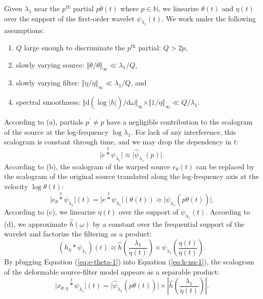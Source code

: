 \documentclass[twoside,a4paper]{article}
\begin{document}
Given $\lambda_1$ near the $p^{\textrm{th}}$ partial $p \dot{\theta}(t)$ where $p \in \mathbb{N}$, we linearize $\theta(t)$ and $\eta(t)$ over the support of the first-order wavelet $\psi_{\lambda_1}(t)$. We work under the following assumptions:
\renewcommand{\labelenumi}{(\alph{enumi})}
\begin{enumerate}
\item $Q$ large enough to discriminate the $p^\text{th}$ partial: $Q>2p$,
\item slowly varying source: $\Vert\ddot{\theta}/\dot{\theta}\Vert_{\infty} \ll \lambda_{1}/Q$,
\item slowly varying filter: $\Vert\ddot{\eta}/\dot{\eta}\Vert_{\infty}\ll\lambda_{1}/Q$, and
\item spectral smoothness: $\Vert\mathrm{d}( \log \vert \hat{h} \vert ) / \mathrm{d} \omega \Vert_{\infty} \times \Vert 1 / \dot{\eta} \Vert_{\infty} \ll Q / \lambda_{1}$.
\end{enumerate}
According to (a), partials $p^{\prime} \neq p$ have a negligible contribution to the scalogram of the source at the log-frequency $\log \lambda_1$. For lack of any interference, this scalogram is constant through time, and we may drop the dependency in $t$:
\begin{equation}
\vert e \overset{t}{\ast} \psi_{\lambda_1} \vert \approx
\vert \widehat{\psi}_{\lambda_1}(p) \vert.
\end{equation}
According to (b), the scalogram of the warped source $e_\theta (t)$ can be replaced by the scalogram of the original source translated along the log-frequency axis at the velocity $\log \dot{\theta}(t)$:
\begin{equation}
\vert e_{\theta} \overset{t}{\ast} \psi_{\lambda_1} \vert (t) =
\vert e \overset{t}{\ast} \psi_{\lambda_1} \vert (\theta(t)) \approx
\vert \widehat{\psi}_{\lambda_1}(p \dot{\theta}(t)) \vert.
\label{eq:e-theta-1}
\end{equation}
According to (c), we linearize $\eta(t)$ over the support of $\psi_{\lambda_1}(t)$. According to (d), we approximate $\hat{h}(\omega)$ by a constant over the frequential support of the wavelet and factorize the filtering as a product:
\begin{equation}
\left( h_\eta \ast \psi_{\lambda_1} \right)(t) \approx
\hat{h}\left(\frac{\lambda_1}{\dot{\eta}(t)}\right)
\times
\psi_{\lambda_1}\left( \frac{\eta(t)}{\dot{\eta}(t)} \right).
\label{eq:h-nu-1}
\end{equation}
By plugging Equation (\ref{eq:e-theta-1}) into Equation (\ref{eq:h-nu-1}), the scalogram of the deformable source-filter model appears as a separable product:
\begin{equation}
\vert x_{\theta,\eta} \overset{t}{\ast} \psi_{\lambda_1} \vert (t) =
\vert \widehat{\psi}_{\lambda_1}(p \dot{\theta}(t)) \vert
\times
\left \vert \hat{h}\left(\frac{\lambda_1}{\dot{\eta}(t)}\right) \right \vert.
\label{eq:factorization}
\end{equation}
\end{document}
